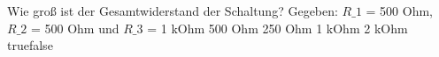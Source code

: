     {Wie groß ist der Gesamtwiderstand der Schaltung? Gegeben: $R\_1$ = 500 Ohm, $R\_2$ = 500 Ohm und $R\_3$ = 1 kOhm}
    {500 Ohm}
    {250 Ohm}
    {1 kOhm}
    {2 kOhm}
    {true}{false}